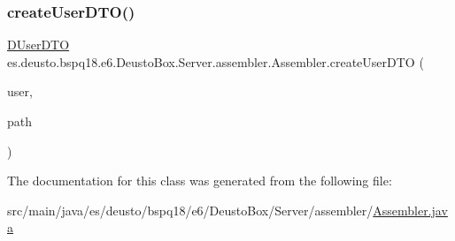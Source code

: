 \mbox{\label{classes_1_1deusto_1_1bspq18_1_1e6_1_1_deusto_box_1_1_server_1_1assembler_1_1_assembler_a9ee0fa62879c38c6e28dc96ff256508e}} 
\subsubsection{\texorpdfstring{create\+User\+D\+T\+O()}{createUserDTO()}}
{\footnotesize\ttfamily \mbox{\hyperlink{classes_1_1deusto_1_1bspq18_1_1e6_1_1_deusto_box_1_1_server_1_1dto_1_1_d_user_d_t_o}{D\+User\+D\+TO}} es.\+deusto.\+bspq18.\+e6.\+Deusto\+Box.\+Server.\+assembler.\+Assembler.\+create\+User\+D\+TO (\begin{DoxyParamCaption}\item[{\mbox{\hyperlink{classes_1_1deusto_1_1bspq18_1_1e6_1_1_deusto_box_1_1_server_1_1jdo_1_1data_1_1_d_user}{D\+User}}}]{user,  }\item[{String}]{path }\end{DoxyParamCaption})}



The documentation for this class was generated from the following file\+:\begin{DoxyCompactItemize}
\item 
src/main/java/es/deusto/bspq18/e6/\+Deusto\+Box/\+Server/assembler/\mbox{\hyperlink{_assembler_8java}{Assembler.\+java}}\end{DoxyCompactItemize}
